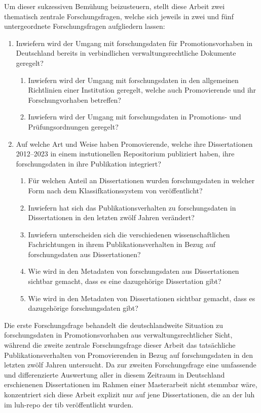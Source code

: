 Um dieser sukzessiven Bemühung beizusteuern, stellt diese Arbeit zwei thematisch zentrale Forschungsfragen, welche sich jeweils in zwei und fünf untergeordnete Forschungsfragen aufgliedern lassen:
\begin{enumerate}
    \item Inwiefern wird der Umgang mit \gls{forschungsdaten} für Promotionsvorhaben in Deutschland bereits in verbindlichen verwaltungsrechtliche Dokumente geregelt?
    \begin{enumerate}
        \item Inwiefern wird der Umgang mit \gls{forschungsdaten} in den allgemeinen Richtlinien einer Institution geregelt, welche auch Promovierende und ihr Forschungvorhaben betreffen?
        \item Inwiefern wird der Umgang mit \gls{forschungsdaten} in Promotions- und Prüfungsordnungen geregelt?
    \end{enumerate}
    \item Auf welche Art und Weise haben Promovierende, welche ihre Dissertationen 2012--2023 in einem instutionellen Repositorium publiziert haben, ihre \gls{forschungsdaten} in ihre Publikation integriert?
    \begin{enumerate}
        \item Für welchen Anteil an Dissertationen wurden \gls{forschungsdaten} in welcher Form nach dem Klassifkationssystem von \citeauthor{ReillyEtAl2011} \autocite{ReillyEtAl2011} veröffentlicht?
        \item Inwiefern hat sich das Publikationsverhalten zu \gls{forschungsdaten} in Dissertationen in den letzten zwölf Jahren verändert?
        \item Inwiefern unterscheiden sich die verschiedenen wissenschaftlichen Fachrichtungen in ihrem Publikationsverhalten in Bezug auf \gls{forschungsdaten} aus Dissertationen?
        \item Wie wird in den Metadaten von \gls{forschungsdaten} aus Dissertationen sichtbar gemacht, dass es eine dazugehörige Dissertation gibt?
        \item Wie wird in den Metadaten von Dissertationen sichtbar gemacht, dass es dazugehörige \gls{forschungsdaten} gibt?
    \end{enumerate}
\end{enumerate}
Die erste Forschungsfrage behandelt die deutschlandweite Situation zu \gls{forschungsdaten} in Promotionsvorhaben aus verwaltungsrechtlicher Sicht, während die zweite zentrale Forschungsfrage dieser Arbeit das tatsächliche Publikationsverhalten von Promovierenden in Bezug auf \gls{forschungsdaten} in den letzten zwölf Jahren untersucht.
Da zur zweiten Forschungsfrage eine umfassende und differenzierte Auswertung aller in diesem Zeitraum in Deutschland erschienenen Dissertationen im Rahmen einer Masterarbeit nicht stemmbar wäre, konzentriert sich diese Arbeit explizit nur auf jene Dissertationen, die an der \gls{luh} im \gls{luh-repo} der \gls{tib} veröffentlicht wurden.

